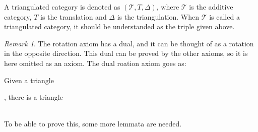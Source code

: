 \documentclass[12pt]{article}
\theoremstyle{definition}
\theoremstyle{remark}
\newtheorem*{remark}{Remark}
\begin{document}
        A triangulated category is denoted as $(\mathcal{T}, T, \Delta)$, where $\mathcal{T}$ is the additive category, $T$ is the translation and $\Delta$ is the triangulation. When $\mathcal{T}$ is called a triangulated category, it should be understanded as the triple given above.
        \begin{remark}
            The rotation axiom has a dual, and it can be thought of as a rotation in the opposite direction. This dual can be proved by the other axioms, so it is here omitted as an axiom. The dual roation axiom goes as:

            Given a triangle , there is a triangle  \\ %
            To be able to prove this, some more lemmata are needed.
        \end{remark}
\end{document}
